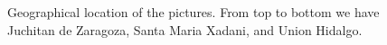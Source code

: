 \begin{figure}[t]
  \begin{center}
  \end{center}
  \caption{Geographical location of the pictures. From top to bottom we have Juchitan de Zaragoza, Santa Maria Xadani, and Union Hidalgo.}
  \label {fig:tsne}
\end{figure}





